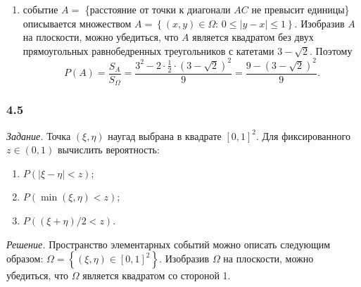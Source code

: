 \begin{enumerate}[label=\alph*)]
\item событие $A =$
\{расстояние от точки к диагонали $AC$ не превысит единицы\}
описывается множеством $A = \left\{ \left( x, y \right) \in \Omega: \, 0 \leq \left| y - x \right| \leq 1 \right\}$.
Изобразив $A$ на плоскости, можно убедиться,
что $A$ является квадратом без двух прямоугольных равнобедренных треугольников с катетами $3 - \sqrt{2}$.
Поэтому
$$P \left( A \right) =
\frac{S_A}{S_{ \Omega }} =
\frac{3^2 - 2 \cdot \frac{1}{2} \cdot \left( 3 - \sqrt{2} \right)^2}{9} =
\frac{9 - \left( 3 - \sqrt{2} \right)^2}{9}.$$
\end{enumerate}

\subsubsection*{4.5}

\textit{Задание.} Точка $ \left( \xi, \eta \right) $ наугад выбрана в квадрате $ \left[ 0, 1 \right]^2$.
Для фиксированного $z \in \left( 0, 1 \right) $ вычислить вероятность:
\begin{enumerate}[label=\alph*)]
\item $P \left( \left| \xi - \eta \right| < z \right) $;
\item $P \left( \min \left( \xi, \eta \right) < z \right) $;
\item $P \left( \left( \xi + \eta \right)/2 < z \right) $.
\end{enumerate}

\textit{Решение.}
Пространство элементарных событий можно описать следующим образом:
$ \Omega =
\left\{ \left( \xi, \eta \right) \in \left[ 0, 1 \right]^2 \right\} $.
Изобразив $ \Omega $ на плоскости, можно убедиться, что $ \Omega $ является квадратом со стороной 1.

